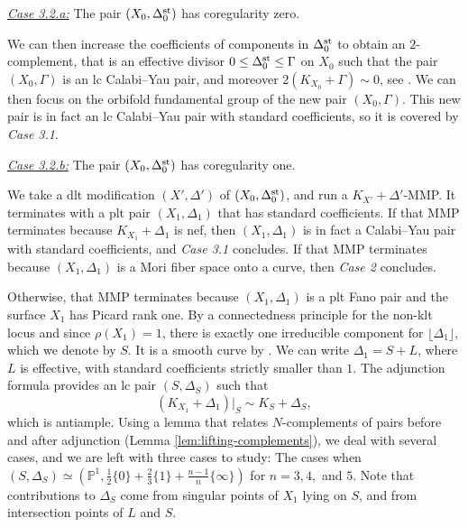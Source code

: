 \documentclass{amsart}
\theoremstyle{definition}
\theoremstyle{remark}
\numberwithin{equation}{section}
\begin{document}
\hfill \begin{minipage}{0.9\textwidth}
\noindent\underline{\textit{Case 3.2.a:}} The pair $(X_0,\Delta_0^{\rm st})$ has coregularity zero.

\medskip

We can then increase the coefficients of components in $\Delta_0^{\rm st}$ to obtain an $2$-complement, that is an effective divisor $0\le \Delta_0^{\rm st}\le \Gamma$ on $X_0$ such that the pair $(X_0,\Gamma)$ is an lc Calabi--Yau pair, and moreover $2(K_{X_0}+\Gamma)\sim 0$, see \cite{FFMP22}. We can then focus on the orbifold fundamental group of the new pair $(X_0,\Gamma)$. This new pair is in fact an lc Calabi--Yau pair with standard coefficients, so it is covered by {\it Case 3.1}.

\medskip

\noindent\underline{\textit{Case 3.2.b:}} The pair $(X_0,\Delta_0^{\rm st})$ has coregularity one.

\medskip

We take a dlt modification $(X',\Delta')$ of $(X_0,\Delta_0^{\rm st})$, and run a $K_{X'}+\Delta'$-MMP. It terminates with a plt pair $(X_1,\Delta_1)$ that has standard coefficients.
If that MMP terminates because $K_{X_1}+\Delta_1$ is nef, then $(X_1,\Delta_1)$ is in fact a Calabi--Yau pair with standard coefficients, and {\it Case 3.1} concludes. If that MMP terminates because $(X_1,\Delta_1)$ is a Mori fiber space onto a curve, then {\it Case 2} concludes.

\medskip

Otherwise, that MMP terminates because $(X_1,\Delta_1)$ is a plt Fano pair and the surface $X_1$ has Picard rank one.
By a connectedness principle for the non-klt locus \cite{FS20} and since $\rho(X_1) = 1$, there is exactly one irreducible component for $\lfloor \Delta_1\rfloor$, which we denote by $S$. It is a smooth curve by \cite[Lemma 3.6]{Sho92}. We can write $\Delta_1 = S + L$, where $L$ is effective, with standard coefficients strictly smaller than $1$. The adjunction formula provides an lc pair $(S,\Delta_S)$ such that $$(K_{X_1}+\Delta_1)|_S\sim K_S+\Delta_S,$$
which is antiample. Using a lemma that relates $N$-complements of pairs before and after adjunction (Lemma \ref{lem:lifting-complements}), we deal with several cases, and we are left with three cases to study:
The cases when $(S,\Delta_S)\simeq \left(\mathbb{P}^1,\frac{1}{2}\{0\}+\frac{2}{3}\{1\}+\frac{n-1}{n}\{\infty\}\right)$ for $n=3,4,$ and $5$. Note that contributions to $\Delta_S$ come from singular points of $X_1$ lying on $S$, and from intersection points of $L$ and $S$.


\end{minipage}
\end{document}
